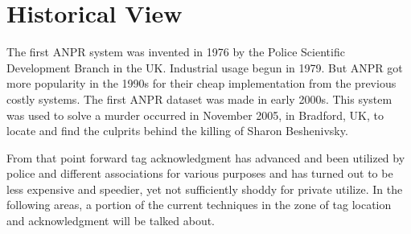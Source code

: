 
\section{Historical View}
The first ANPR system was invented in 1976 by the Police Scientific Development Branch in the UK. Industrial usage begun in 1979. But ANPR got more popularity in the 1990s for their cheap implementation from the previous costly systems. The first ANPR dataset was made in early 2000s. This system was used to solve a murder occurred in November 2005, in Bradford, UK, to locate and find the culprits behind the killing of Sharon Beshenivsky.

From that point forward tag acknowledgment has advanced and been utilized by police and different associations for various purposes and has turned out to be less expensive and speedier, yet not sufficiently shoddy for private utilize. In the following areas, a portion of the current techniques in the zone of tag location and acknowledgment will be talked about.